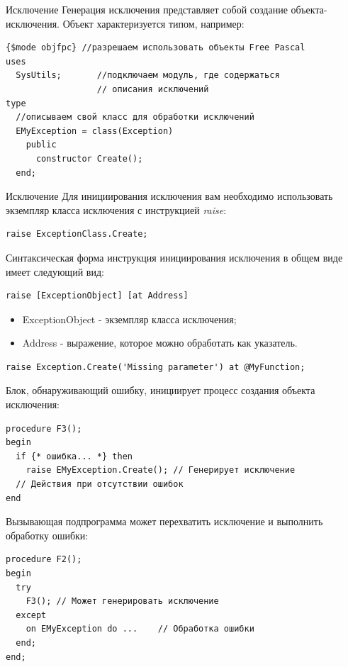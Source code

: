 \documentclass[xcolor=table]{beamer}
\begin{document}
\begin{frame}[fragile]{Исключение}
	Генерация исключения представляет собой создание объекта-исключения. Объект характеризуется типом, например:
	\begin{verbatim}
{$mode objfpc} //разрешаем использовать объекты Free Pascal
uses
  SysUtils;		  //подключаем модуль, где содержаться 
                  // описания исключений
type
  //описываем свой класс для обработки исключений
  EMyException = class(Exception)
    public
      constructor Create();
  end;
	\end{verbatim}
\end{frame}

\begin{frame}[fragile]{Исключение}
	Для инициирования исключения вам необходимо использовать экземпляр класса исключения с инструкцией \textit{raise}:
	\begin{verbatim}
raise ExceptionClass.Create;
	\end{verbatim}
	
	Синтаксическая форма инструкция инициирования исключения в общем виде имеет следующий вид:
	\begin{verbatim}
raise [ExceptionObject] [at Address]
	\end{verbatim}
	
	\begin{itemize}
		\item ExceptionObject - экземпляр класса исключения;
		\item Address - выражение, которое можно обработать как указатель.
	\end{itemize}
	
	\begin{verbatim}
raise Exception.Create('Missing parameter') at @MyFunction;
	\end{verbatim}
\end{frame}

\begin{frame}[fragile]
	Блок, обнаруживающий ошибку, инициирует процесс создания объекта исключения:
	\begin{verbatim}
procedure F3();
begin
  if {* ошибка... *} then
    raise EMyException.Create(); // Генерирует исключение
  // Действия при отсутствии ошибок
end
	\end{verbatim}
	Вызывающая подпрограмма может перехватить исключение и выполнить обработку ошибки:
	\begin{verbatim}
procedure F2();
begin
  try 
    F3(); // Может генерировать исключение
  except
    on EMyException do ...    // Обработка ошибки
  end;
end;
	\end{verbatim}
\end{frame}
\end{document}
